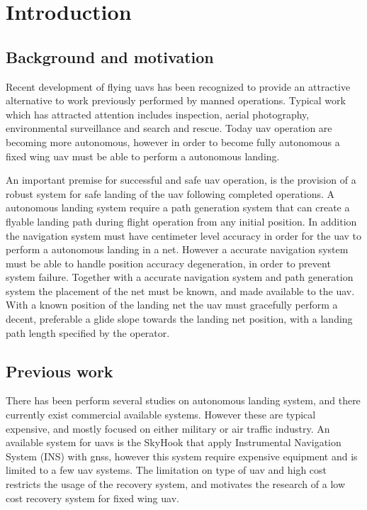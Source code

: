 \chapter{Introduction}
\section{Background and motivation}
Recent development of flying \glspl{uav} has been recognized to provide an attractive alternative to work previously performed by manned operations. Typical work which has attracted attention includes inspection, aerial photography, environmental surveillance and search and rescue. Today \gls{uav} operation are becoming more autonomous, however in order to become fully autonomous a fixed wing \gls{uav} must be able to perform a autonomous landing.

An important premise for successful and safe \gls{uav} operation, is the provision of a robust system for safe landing of the \gls{uav} following completed operations. A autonomous landing system require a path generation system that can create a flyable landing path during flight operation from any initial position. In addition the navigation system must have centimeter level accuracy in order for the \gls{uav} to perform a autonomous landing in a net. However a accurate navigation system must be able to handle position accuracy degeneration, in order to prevent system failure. Together with a accurate navigation system and path generation system the placement of the net must be known, and made available to the \gls{uav}. With a known position of the landing net the \gls{uav} must gracefully perform a decent, preferable a glide slope towards the landing net position, with a landing path length specified by the operator.
\section{Previous work}
There has been perform several studies on autonomous landing system, and there currently exist commercial available systems. However these are typical expensive, and mostly focused on either military or air traffic industry. An available system for \glspl{uav} is the SkyHook that apply Instrumental Navigation System (INS) with \gls{gnss}\citep{SkyHook}, however this system require expensive equipment and is limited to a few \gls{uav} systems. The limitation on type of \gls{uav} and high cost restricts the usage of the recovery system, and motivates the research of a low cost recovery system for fixed wing \gls{uav}.

